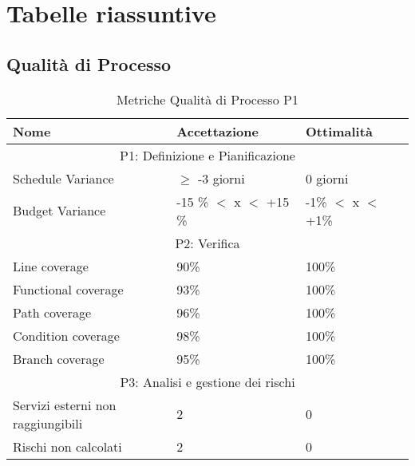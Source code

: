 \section{Tabelle riassuntive}
    \subsection{Qualità di Processo}
\begin{table}[!htpb]
	\centering
	\renewcommand{\arraystretch}{2} 
	\begin{tabular}{|p{8cm}|p{3.5cm}|p{3.5cm}|}
		\hline
		\rowcolor{orange!50} 
		\textbf{Nome} & \textbf{Accettazione} & \textbf{Ottimalità} \\
		\hline
		\multicolumn{3}{|c|}{P1: Definizione e Pianificazione}\\
		\hline
		Schedule Variance & $\geq$ -3 giorni &0 giorni \\
		\hline
		Budget Variance & -15 \% $<$ x $<$ +15 \% & -1\% $<$ x $<$ +1\% \\ 
		\hline
		\multicolumn{3}{|c|}{P2: Verifica} \\
		\hline
		Line coverage & 90\% & 100\% \\
		\hline
		Functional coverage & 93\% & 100\% \\
		\hline
		Path coverage & 96\% & 100\% \\
		\hline
		Condition coverage & 98\% & 100\% \\
		\hline
		Branch coverage & 95\% & 100\% \\
		\hline
		\multicolumn{3}{|c|}{P3: Analisi e gestione dei rischi} \\
		\hline
		Servizi esterni non raggiungibili & 2 & 0 \\
		\hline
		Rischi non calcolati & 2 & 0 \\
		\hline
	\end{tabular}
	\caption{Metriche Qualità di Processo P1}
\end{table}

